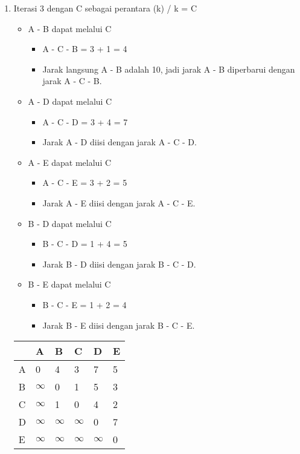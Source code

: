 \begin{enumerate}
    \item Iterasi 3 dengan C sebagai perantara (k) / k = C
    \begin{itemize}
        \item A - B dapat melalui C
        \begin{itemize}
            \item A - C - B = 3 + 1 = 4
            \item Jarak langsung A - B adalah 10, jadi jarak A - B diperbarui dengan jarak A - C - B.
        \end{itemize}
        \item A - D dapat melalui C
        \begin{itemize}
            \item A - C - D = 3 + 4 = 7
            \item Jarak A - D diisi dengan jarak A - C - D.
        \end{itemize}
        \item A - E dapat melalui C
        \begin{itemize}
            \item A - C - E = 3 + 2 = 5
            \item Jarak A - E diisi dengan jarak A - C - E.
        \end{itemize}
        \item B - D dapat melalui C
        \begin{itemize}
            \item B - C - D = 1 + 4 = 5
            \item Jarak B - D diisi dengan jarak B - C - D.
        \end{itemize}
        \item B - E dapat melalui C
        \begin{itemize}
            \item B - C - E = 1 + 2 = 4
            \item Jarak B - E diisi dengan jarak B - C - E.
        \end{itemize}
    \end{itemize}
    \begin{table}[h]
        \begin{tabular}{|l|l|l|l|l|l|}
        \hline
          & A        & B        & C        & D        & E        \\ \hline
        A & 0        & 4        & 3        & 7        & 5 \\ \hline
        B & $\infty$ & 0        & 1        & 5        & 3 \\ \hline
        C & $\infty$ & 1        & 0        & 4        & 2        \\ \hline
        D & $\infty$ & $\infty$ & $\infty$ & 0        & 7        \\ \hline
        E & $\infty$ & $\infty$ & $\infty$ & $\infty$ & 0        \\ \hline
        \end{tabular}
    \end{table}


\end{enumerate}
